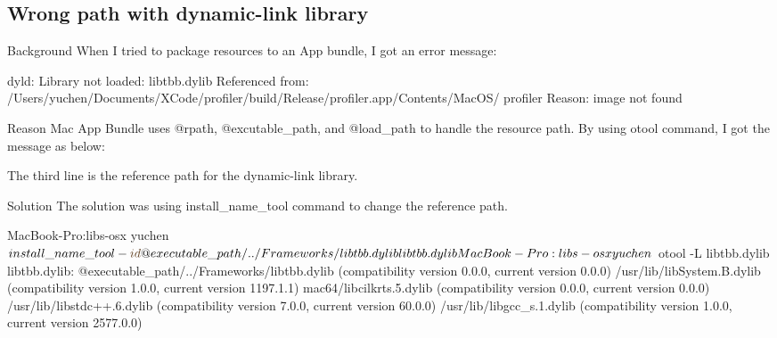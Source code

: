 \hypertarget{_reviewof_project_ReviewofProjectPEFWrongPathwithDynamiclinkLibrary}{}\subsection{Wrong path with dynamic-\/link library}\label{_reviewof_project_ReviewofProjectPEFWrongPathwithDynamiclinkLibrary}
\begin{DoxyParagraph}{Background}
When I tried to package resources to an App bundle, I got an error message\+: 
\begin{DoxyCode}
dyld: Library not loaded: libtbb.dylib
  Referenced from: /Users/yuchen/Documents/XCode/profiler/build/Release/profiler.app/Contents/MacOS/
      profiler
  Reason: image not found
\end{DoxyCode}
 
\end{DoxyParagraph}
\begin{DoxyParagraph}{Reason}
Mac App Bundle uses @rpath, @excutable\+\_\+path, and @load\+\_\+path to handle the resource path. By using otool command, I got the message as below\+: 
 The third line is the reference path for the dynamic-\/link library. 
\end{DoxyParagraph}
\begin{DoxyParagraph}{Solution}
The solution was using install\+\_\+name\+\_\+tool command to change the reference path. 
\begin{DoxyCode}
MacBook-Pro:libs-osx yuchen$ install\_name\_tool -\textcolor{keywordtype}{id} @executable\_path/../Frameworks/libtbb.dylib libtbb.dylib
       
MacBook-Pro:libs-osx yuchen$ otool -L libtbb.dylib 
libtbb.dylib:
    @executable\_path/../Frameworks/libtbb.dylib (compatibility version 0.0.0, current version 0.0.0)
    /usr/lib/libSystem.B.dylib (compatibility version 1.0.0, current version 1197.1.1)
    mac64/libcilkrts.5.dylib (compatibility version 0.0.0, current version 0.0.0)
    /usr/lib/libstdc++.6.dylib (compatibility version 7.0.0, current version 60.0.0)
    /usr/lib/libgcc\_s.1.dylib (compatibility version 1.0.0, current version 2577.0.0)
\end{DoxyCode}

\end{DoxyParagraph}
